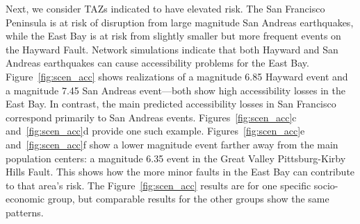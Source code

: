 



Next, we consider TAZs indicated to have elevated risk.
The San Francisco Peninsula is at risk of disruption from large magnitude San Andreas earthquakes, while the East Bay is at risk from slightly smaller but more frequent events on the Hayward Fault. Network simulations indicate that both Hayward and San Andreas earthquakes can cause accessibility problems for the East Bay. Figure~\ref{fig:scen_acc} shows realizations of a magnitude 6.85 Hayward event and a magnitude 7.45 San Andreas event---both show high accessibility losses in the East Bay.
In contrast, the main predicted accessibility losses in San Francisco correspond primarily to San Andreas events.
Figures~\ref{fig:scen_acc}{c} and~\ref{fig:scen_acc}{d} provide one such example. Figures~\ref{fig:scen_acc}{e} and~\ref{fig:scen_acc}{f} show a lower magnitude event farther away from the main population centers: a magnitude 6.35 event in the Great Valley Pittsburg-Kirby Hills Fault. This shows how the more minor faults in the East Bay can contribute to that area's risk.
The Figure~\ref{fig:scen_acc} results are for one specific socio-economic group, but comparable results for the other groups show the same patterns.



